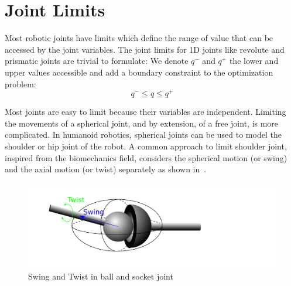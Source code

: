 

\section{Joint Limits}
\label{sec:joint_limits}


Most robotic joints have limits which define the range of value that can be accessed by the joint variables.
The joint limits for 1D joints like revolute and prismatic joints are trivial to formulate: We denote $q^-$ and $q^+$ the lower and upper values accessible and add a boundary constraint to the optimization problem:
\begin{equation}
\label{eq:joint_limits}
  \boxed{q^- \leq q \leq q^+}
\end{equation}

Most joints are easy to limit because their variables are independent.
Limiting the movements of a spherical joint, and by extension, of a free joint, is more complicated.
In humanoid robotics, spherical joints can be used to model the shoulder or hip joint of the robot.
A common approach to limit shoulder joint, inspired from the biomechanics field, considers the spherical motion (or swing) and the axial motion (or twist) separately as shown in~.

\begin{figure}[htb]
  \centering
  \includegraphics[width=0.7\linewidth]{ballAndSocket.pdf}
  \caption{Swing and Twist in ball and socket joint}
\label{fig:ballAndSocket}
\end{figure}

